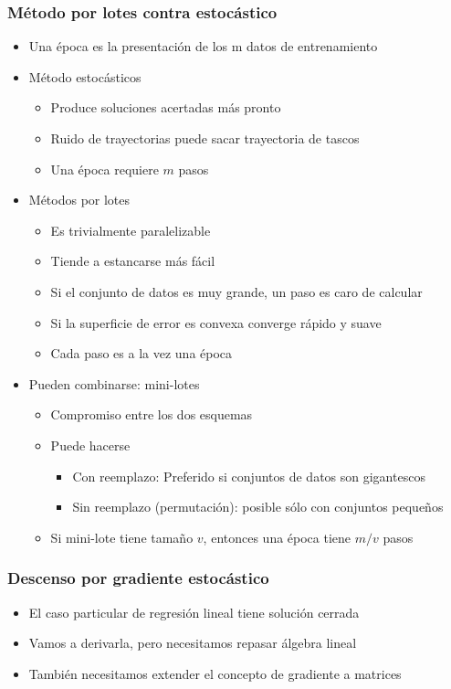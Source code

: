 \documentclass[spanish]{beamer}
\begin{document}
\begin{frame}
\frametitle{Método por lotes contra estocástico}  
\begin{itemize}
\item Una época es la presentación de los m datos de entrenamiento 
\item Método estocásticos 
\begin{itemize}
\item Produce soluciones acertadas más pronto 
\item Ruido de trayectorias puede sacar trayectoria de tascos 
\item Una época requiere $m$ pasos 
\end{itemize}
\item Métodos por lotes 
\begin{itemize}
\item Es trivialmente paralelizable 
\item Tiende a estancarse más fácil
\item Si el conjunto de datos es muy grande, un paso es caro de calcular
\item Si la superficie de error es convexa converge rápido y suave 
\item Cada paso es a la vez una época 
\end{itemize}
\item Pueden combinarse: mini-lotes 
\begin{itemize}
\item Compromiso entre los dos esquemas 
\item Puede hacerse 
\begin{itemize}
\item Con reemplazo: Preferido si conjuntos de datos son gigantescos 
\item Sin reemplazo (permutación): posible sólo con conjuntos pequeños  
\end{itemize}
\item Si mini-lote tiene tamaño $v$, entonces una época tiene $m/v$ pasos
\end{itemize}
\end{itemize} 

\end{frame}
\begin{frame}
\frametitle{Descenso por gradiente estocástico}  
\begin{itemize}
\item El caso particular de regresión lineal tiene solución cerrada 
\item Vamos a derivarla, pero necesitamos repasar álgebra lineal 
\item También necesitamos extender el concepto de gradiente a matrices 
\end{itemize}
\end{frame}
\end{document}
